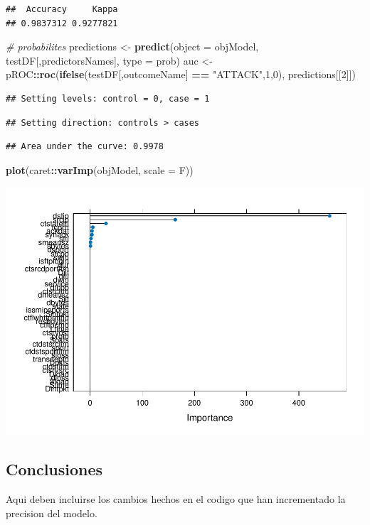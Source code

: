 \documentclass[
]{article}
\newenvironment{Shaded}{\begin{snugshade}}{\end{snugshade}}
\newcommand{\AttributeTok}[1]{\textcolor[rgb]{0.13,0.29,0.53}{#1}}
\newcommand{\CommentTok}[1]{\textcolor[rgb]{0.56,0.35,0.01}{\textit{#1}}}
\newcommand{\DecValTok}[1]{\textcolor[rgb]{0.00,0.00,0.81}{#1}}
\newcommand{\FunctionTok}[1]{\textcolor[rgb]{0.13,0.29,0.53}{\textbf{#1}}}
\newcommand{\NormalTok}[1]{#1}
\newcommand{\OtherTok}[1]{\textcolor[rgb]{0.56,0.35,0.01}{#1}}
\newcommand{\SpecialCharTok}[1]{\textcolor[rgb]{0.81,0.36,0.00}{\textbf{#1}}}
\newcommand{\StringTok}[1]{\textcolor[rgb]{0.31,0.60,0.02}{#1}}
\begin{document}
\begin{verbatim}
##  Accuracy     Kappa 
## 0.9837312 0.9277821
\end{verbatim}

\begin{Shaded}
\begin{Highlighting}[]
\CommentTok{\# probabilites}
\NormalTok{predictions }\OtherTok{\textless{}{-}} \FunctionTok{predict}\NormalTok{(}\AttributeTok{object =}\NormalTok{ objModel, testDF[,predictorsNames], }\AttributeTok{type =} \StringTok{\textquotesingle{}prob\textquotesingle{}}\NormalTok{)}
\NormalTok{auc }\OtherTok{\textless{}{-}}\NormalTok{ pROC}\SpecialCharTok{::}\FunctionTok{roc}\NormalTok{(}\FunctionTok{ifelse}\NormalTok{(testDF[,outcomeName] }\SpecialCharTok{==} \StringTok{"ATTACK"}\NormalTok{,}\DecValTok{1}\NormalTok{,}\DecValTok{0}\NormalTok{), predictions[[}\DecValTok{2}\NormalTok{]])}
\end{Highlighting}
\end{Shaded}

\begin{verbatim}
## Setting levels: control = 0, case = 1
\end{verbatim}

\begin{verbatim}
## Setting direction: controls > cases
\end{verbatim}

\begin{Shaded}
\end{Shaded}

\begin{verbatim}
## Area under the curve: 0.9978
\end{verbatim}

\begin{Shaded}
\begin{Highlighting}[]
\FunctionTok{plot}\NormalTok{(caret}\SpecialCharTok{::}\FunctionTok{varImp}\NormalTok{(objModel, }\AttributeTok{scale =}\NormalTok{ F))}
\end{Highlighting}
\end{Shaded}

\includegraphics{supervised_files/figure-latex/var_importance-1.pdf}

\subsection{Conclusiones}\label{conclusiones}

Aqui deben incluirse los cambios hechos en el codigo que han
incrementado la precision del modelo.
\end{document}
